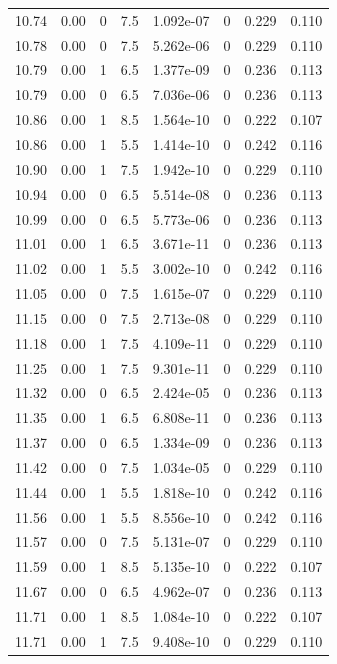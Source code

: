 \documentclass[preview]{standalone}
\begin{document}
{{{{{{{{{\begin{tabular}{L{1.2cm}C{1.2cm} C{0.3cm}C{0.5cm} C{1.4cm}C{1.4cm} C{1.4cm}C{1.4cm}}
  10.74  &  0.00  & 0     & 7.5 &  1.092e-07  & 0  & 0.229 &  0.110   \\ 
  10.78  &  0.00  & 0     & 7.5 &  5.262e-06  & 0  & 0.229 &  0.110   \\ 
  10.79  &  0.00  & 1     & 6.5 &  1.377e-09  & 0  & 0.236 &  0.113   \\ 
  10.79  &  0.00  & 0     & 6.5 &  7.036e-06  & 0  & 0.236 &  0.113   \\ 
  10.86  &  0.00  & 1     & 8.5 &  1.564e-10  & 0  & 0.222 &  0.107   \\ 
  10.86  &  0.00  & 1     & 5.5 &  1.414e-10  & 0  & 0.242 &  0.116   \\ 
  10.90  &  0.00  & 1     & 7.5 &  1.942e-10  & 0  & 0.229 &  0.110   \\ 
  10.94  &  0.00  & 0     & 6.5 &  5.514e-08  & 0  & 0.236 &  0.113   \\ 
  10.99  &  0.00  & 0     & 6.5 &  5.773e-06  & 0  & 0.236 &  0.113   \\ 
  11.01  &  0.00  & 1     & 6.5 &  3.671e-11  & 0  & 0.236 &  0.113   \\ 
  11.02  &  0.00  & 1     & 5.5 &  3.002e-10  & 0  & 0.242 &  0.116   \\ 
  11.05  &  0.00  & 0     & 7.5 &  1.615e-07  & 0  & 0.229 &  0.110   \\ 
  11.15  &  0.00  & 0     & 7.5 &  2.713e-08  & 0  & 0.229 &  0.110   \\ 
  11.18  &  0.00  & 1     & 7.5 &  4.109e-11  & 0  & 0.229 &  0.110   \\ 
  11.25  &  0.00  & 1     & 7.5 &  9.301e-11  & 0  & 0.229 &  0.110   \\ 
  11.32  &  0.00  & 0     & 6.5 &  2.424e-05  & 0  & 0.236 &  0.113   \\ 
  11.35  &  0.00  & 1     & 6.5 &  6.808e-11  & 0  & 0.236 &  0.113   \\ 
  11.37  &  0.00  & 0     & 6.5 &  1.334e-09  & 0  & 0.236 &  0.113   \\ 
  11.42  &  0.00  & 0     & 7.5 &  1.034e-05  & 0  & 0.229 &  0.110   \\ 
  11.44  &  0.00  & 1     & 5.5 &  1.818e-10  & 0  & 0.242 &  0.116   \\ 
  11.56  &  0.00  & 1     & 5.5 &  8.556e-10  & 0  & 0.242 &  0.116   \\ 
  11.57  &  0.00  & 0     & 7.5 &  5.131e-07  & 0  & 0.229 &  0.110   \\ 
  11.59  &  0.00  & 1     & 8.5 &  5.135e-10  & 0  & 0.222 &  0.107   \\ 
  11.67  &  0.00  & 0     & 6.5 &  4.962e-07  & 0  & 0.236 &  0.113   \\ 
  11.71  &  0.00  & 1     & 8.5 &  1.084e-10  & 0  & 0.222 &  0.107   \\ 
  11.71  &  0.00  & 1     & 7.5 &  9.408e-10  & 0  & 0.229 &  0.110   \\ 
\hline 
\end{tabular} 

}}}}}}}}}
\end{document}
